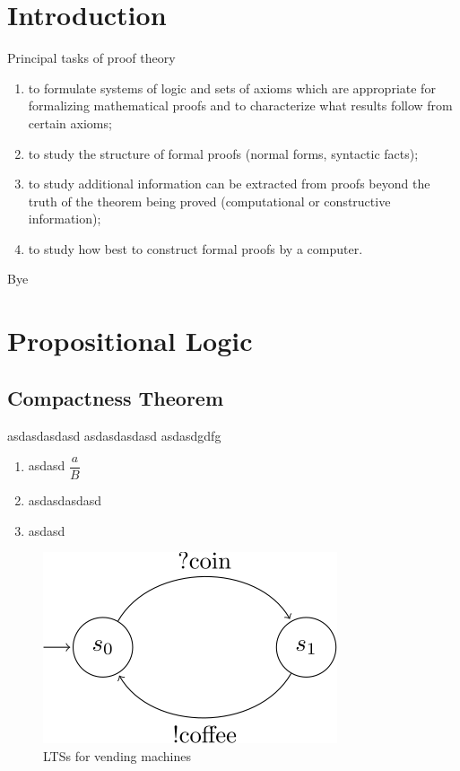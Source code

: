 \documentclass[xcolor=dvipsnames, aspectratio=169, 10pt]{beamer}
\begin{document}
\TitlePage
\SectionPage
\SubsectionPage
\ProgressBar
\PageNumbering
\section{Introduction}
\begin{frame}
	Principal tasks of proof theory \cite{buss1998handbook}
	\begin{enumerate}
		\item to formulate systems of logic and sets of axioms which are appropriate for formalizing mathematical proofs and to characterize what results follow from certain axioms;
		\item to study the structure of formal proofs (normal forms, syntactic facts);
		\item to study additional information can be extracted from proofs beyond the truth of the theorem being proved (computational or constructive information);
		\item to study how best to construct formal proofs by a computer.
	\end{enumerate}
\end{frame}

\begin{frame}
	Bye
\end{frame}
\section{Propositional Logic}
\subsection{Compactness Theorem}
\begin{frame}
  asdasdasdasd
  asdasdasdasd
  asdasdgdfg
  \cite{buss1998handbook}
  \begin{enumerate}
    \item asdasd $\dfrac{a}{B}$
    \item asdasdasdasd
    \item asdasd
  \end{enumerate}
  \begin{figure}
    \centering
    \includegraphics{images/tikz_1.svg}
    \caption{LTSs for vending machines}
    \label{fig:lts-vending-machines}
  \end{figure}
\end{frame}
\begin{frame}
  \printbibliography
\end{frame}
\end{document}
